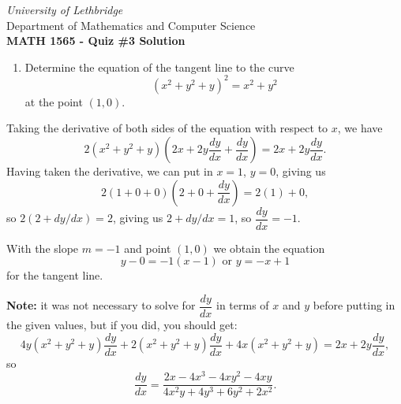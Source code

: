 \documentclass[12pt]{article}
\begin{document}
\thispagestyle{empty}
\begin{center}
\emph{University of Lethbridge}\\
Department of Mathematics and Computer Science\\
{\bf MATH 1565 - Quiz \#3 Solution}\\
\end{center}
\thispagestyle{empty}
\begin{enumerate}
 \item Determine the equation of the tangent line to the curve
 \[
 (x^2+y^2+y)^2=x^2+y^2
 \]
 at the point $(1,0)$.
\end{enumerate}

Taking the derivative of both sides of the equation with respect to $x$, we have
\[
2(x^2+y^2+y)\left(2x+2y\frac{dy}{dx}+\frac{dy}{dx}\right)=2x+2y\frac{dy}{dx}.
\]
Having taken the derivative, we can put in $x=1$, $y=0$, giving us
\[
2(1+0+0)\left(2+0+\frac{dy}{dx}\right)=2(1)+0,
\]
so $2(2+dy/dx)=2$, giving us $2+dy/dx=1$, so  $\dfrac{dy}{dx}=-1$.

With the slope $m=-1$ and point $(1,0)$ we obtain the equation
\[
y-0=-1(x-1) \text{ or } y=-x+1
\]
for the tangent line.

\bigskip

\textbf{Note:} it was not necessary to solve for $\dfrac{dy}{dx}$ in terms of $x$ and $y$ before putting  in the given values, but if you did, you should get:
\[
4y(x^2+y^2+y)\frac{dy}{dx}+2(x^2+y^2+y)\frac{dy}{dx}+4x(x^2+y^2+y)=2x+2y\frac{dy}{dx},
\]
so
\[
\frac{dy}{dx} = \frac{2x-4x^3-4xy^2-4xy}{4x^2y+4y^3+6y^2+2x^2}.
\]
\end{document}
